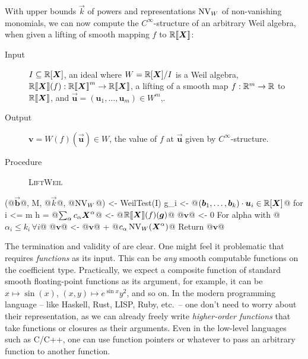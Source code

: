 With upper bounds $\vec k$ of powers and representations $\operatorname{NV}_W$ of non-vanishing monomials, we can now compute the $C^\infty$-structure of an arbitrary Weil algebra, when given a lifting of smooth mapping $f$ to $\mathord{\mathbb{R}\llbracket\boldsymbol{X}\rrbracket}$:

\begin{algorithm}\label{alg:smooth-weil}
  \hfill\vspace{-.25em}
  \begin{description}
    \item[Input]
      $I \subseteq \mathbb{R}[\boldsymbol{X}]$, an ideal where $W = \mathbb{R}[\boldsymbol{X}]/I$ is a Weil algebra,
      $\mathbb{R} \llbracket\boldsymbol{X}\rrbracket(f): \mathord{\mathbb{R}\llbracket\boldsymbol{X}\rrbracket}^m \to \mathord{\mathbb{R}\llbracket\boldsymbol{X}\rrbracket}$, a lifting of a smooth map $f: \mathbb{R}^m \to \mathbb{R}$ to $\mathord{\mathbb{R}\llbracket\boldsymbol{X}\rrbracket}$, and $\vec{\boldsymbol{u}} = (\boldsymbol{u}_1, \dots, \boldsymbol{u}_m) \in W^m$,.
    \item[Output] $\boldsymbol{v} = W(f)(\vec{\boldsymbol u}) \in W$, the value of $f$ at $\vec{\boldsymbol{u}}$ given by $C^\infty$-structure.
    \item[Procedure] \textup{\textsc{LiftWeil}}
  \end{description}
\begin{alg}
(@$\vec{\boldsymbol{b}}$@, M, @$\vec{k}$@, @$\operatorname{NV}_W$@) <- WeilTest(I)
g_i <- @$(\boldsymbol{b}_1, \dots, \boldsymbol{b}_k) \cdot \boldsymbol{u}_i \in \mathbb{R}[\boldsymbol{X}]$@ for i <= m
h = @$\sum_\alpha c_\alpha \boldsymbol{X}^\alpha$@ <- @$\Rseries(f)(\vec{g})$@
@$\boldsymbol v$@ <- 0
For alpha with @$\alpha_i \leq k_i\, \forall i$@
  @$\boldsymbol{v}$@ <- @$\boldsymbol v$@ + @$c_\alpha \operatorname{NV}_W(\boldsymbol{X}^\alpha)$@
Return @$\boldsymbol{v}$@
\end{alg}
\end{algorithm}

The termination and validity of  are clear.
One might feel it problematic that  requires \emph{functions} as its input.
This can be \emph{any} smooth computable functions on the coefficient type.
Practically, we expect a composite function of standard smooth floating-point functions as its argument,
for example, it can be $x \mapsto \sin(x)$, $(x, y) \mapsto e^{\sin x}y^2$, and so on.
In the modern programming language -- like Haskell, Rust, LISP, Ruby, etc.\ -- one don't need to worry about their representation, as we can already freely write \emph{higher-order functions} that take functions or closures as their arguments.
Even in the low-level languages such as C/C++, one can use function pointers or whatever to pass an arbitrary function to another function.

